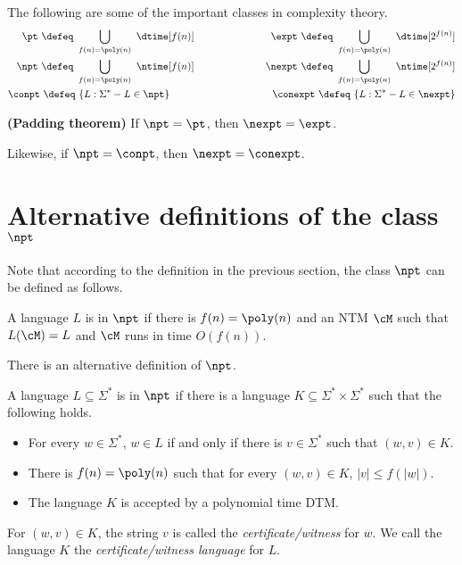 \documentclass[11pt, a4paper]{article}
\begin{document}
The following are some of the important classes in complexity theory.
\begin{eqnarray*}
\pt \ \defeq \ \bigcup_{f(n)=\poly(n)} \ \dtime[f(n)]
&\hspace{1.5cm} &
\hspace{0.8cm}\expt \ \defeq \ \bigcup_{f(n)=\poly(n)} \ \dtime[2^{f(n)}]
\\
\npt \ \defeq \ \bigcup_{f(n)=\poly(n)} \ \ntime[f(n)]
& &
\hspace{0.45cm}\nexpt \ \defeq \ \bigcup_{f(n)=\poly(n)} \ \ntime[2^{f(n)}]
\\
\conpt \ \defeq \ \{L  :  \Sigma^{\ast}-L \in \npt\}\hspace{0.85cm}
& & 
\conexpt  \ \defeq \ \{L :  \Sigma^{\ast}-L \in \nexpt\}
\end{eqnarray*}

\begin{theorem}
\label{theo:padding}
{\bf (Padding theorem)}
If $\npt=\pt$, then $\nexpt=\expt$. 

Likewise, if $\npt=\conpt$, then $\nexpt=\conexpt$.
\end{theorem}



\section{Alternative definitions of the class $\npt$}
\label{sec:def-np}

Note that according to the definition in the previous section,
the class $\npt$ can be defined as follows.

\begin{definition}
\label{def:np-a}
A language $L$ is in $\npt$ if 
there is $f(n)=\poly(n)$ and an NTM $\cM$ such that $L(\cM)=L$ and 
$\cM$ runs in time $O(f(n))$.
\end{definition}

There is an alternative definition of $\npt$.

\begin{definition}
\label{def:np-b}
A language $L\subseteq \Sigma^*$ is in $\npt$ if
there is a language $K \subseteq \Sigma^*\times\Sigma^*$ such that the following holds.
\begin{itemize}
\item
For every $w\in \Sigma^*$,
$w\in L$ if and only if there is $v\in\Sigma^*$ such that $(w,v)\in K$.
\item
There is $f(n)=\poly(n)$ such that for every $(w,v)\in K$,
$|v|\leq f(|w|)$.
\item
The language $K$ is accepted by a polynomial time DTM.
\end{itemize}
For $(w,v)\in K$, the string $v$ is called the {\em certificate/witness} for $w$.
We call the language $K$ the {\em certificate/witness language} for $L$.
\end{definition}
\end{document}
